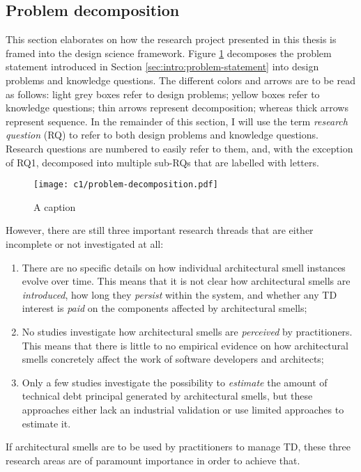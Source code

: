 \subsection{Problem decomposition}
This section elaborates on how the research project presented in this thesis is framed into the design science framework. 
Figure \ref{fig:intro:problem-decomposition} decomposes the problem statement introduced in Section \ref{sec:intro:problem-statement} into design problems and knowledge questions.
The different colors and arrows are to be read as follows: light grey boxes refer to design problems; yellow boxes refer to knowledge questions; thin arrows represent decomposition; whereas thick arrows represent sequence.
In the remainder of this section, I will use the term \emph{research question} (RQ) to refer to both design problems and knowledge questions.
Research questions are numbered to easily refer to them, and, with the exception of RQ1, decomposed into multiple sub-RQs that are labelled with letters.

\begin{figure}
    \centering
    \texttt{[image: c1/problem-decomposition.pdf]}
    \caption{A caption}\label{fig:intro:problem-decomposition}
\end{figure}

However, there are still three important research threads that are either incomplete or not investigated at all:
\begin{enumerate}
    \item There are no specific details on how individual architectural smell instances evolve over time. This means that it is not clear how architectural smells are \emph{introduced}, how long they \emph{persist} within the system, and whether any TD interest is \emph{paid} on the components affected by architectural smells; 
    
    \item No studies investigate how architectural smells are \emph{perceived} by practitioners. This means that there is little to no empirical evidence on how architectural smells concretely affect the work of software developers and architects;
    
    \item Only a few studies investigate the possibility to \emph{estimate} the amount of technical debt principal generated by architectural smells, but these approaches either lack an industrial validation or use limited approaches to estimate it. 
\end{enumerate}
If architectural smells are to be used by practitioners to manage TD, these three research areas are of paramount importance in order to achieve that.

